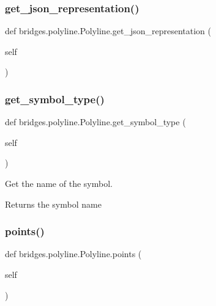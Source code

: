 \subsubsection{\texorpdfstring{get\+\_\+json\+\_\+representation()}{get\_json\_representation()}}
{\footnotesize\ttfamily def bridges.\+polyline.\+Polyline.\+get\+\_\+json\+\_\+representation (\begin{DoxyParamCaption}\item[{}]{self }\end{DoxyParamCaption})}

\mbox{\label{classbridges_1_1polyline_1_1_polyline_aae397f351a52883654e1edbb1069369e}} 
\subsubsection{\texorpdfstring{get\+\_\+symbol\+\_\+type()}{get\_symbol\_type()}}
{\footnotesize\ttfamily def bridges.\+polyline.\+Polyline.\+get\+\_\+symbol\+\_\+type (\begin{DoxyParamCaption}\item[{}]{self }\end{DoxyParamCaption})}



Get the name of the symbol. 

\begin{DoxyReturn}{Returns}
the symbol name 
\end{DoxyReturn}
\mbox{\label{classbridges_1_1polyline_1_1_polyline_ad1671a5857ad9e4010b7783b472c83fa}} 
\subsubsection{\texorpdfstring{points()}{points()}\hspace{0.1cm}{\footnotesize\ttfamily [1/2]}}
{\footnotesize\ttfamily def bridges.\+polyline.\+Polyline.\+points (\begin{DoxyParamCaption}\item[{}]{self }\end{DoxyParamCaption})}



